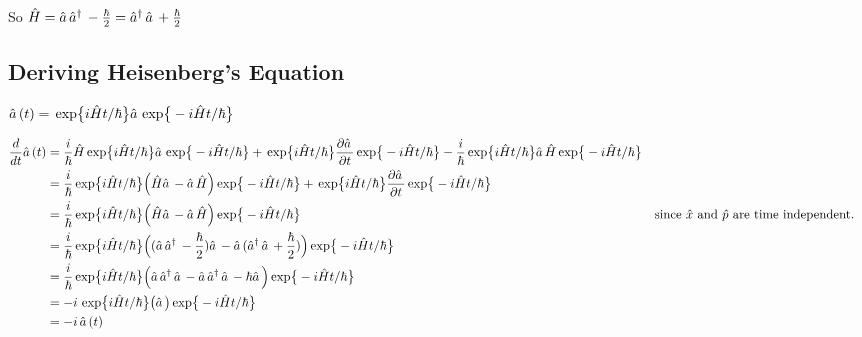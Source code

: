 \documentclass{article}
\renewcommand{\exp}[1]{\,\text{exp} \big\{ #1 \big\} }
\begin{document}
So
\( \hat{H}
    = \hat{a} \,\hat{a}^{\dagger} \, - \frac{\hbar}{2}
    = \hat{a}^{\dagger} \,\hat{a} \, + \frac{\hbar}{2}
\)

\subsection*{Deriving  Heisenberg's Equation}
\( \aop(t) = \exp{i\hat{H}t/\hbar} \aop \exp{-i\hat{H}t/\hbar} \)

\begin{align*}
    \frac{d}{dt} \aop(t)
    &= \frac{i}{\hbar}\hat{H} \exp{i\hat{H}t/\hbar} \aop \exp{-i\hat{H}t/\hbar} +
        \exp{i\hat{H}t/\hbar} \frac{\partial \aop}{\partial t} \exp{-i\hat{H}t/\hbar} - \frac{i}{\hbar} \exp{i\hat{H}t/\hbar} \aop \hat{H} \exp{-i\hat{H}t/\hbar} \\
    &= \frac{i}{\hbar} \exp{i\hat{H}t/\hbar} \Big( \hat{H}\aop - \aop\hat{H} \Big) \exp{-i\hat{H}t/\hbar} +
        \exp{i\hat{H}t/\hbar} \frac{\partial \aop}{\partial t} \exp{-i\hat{H}t/\hbar} \\
    &= \frac{i}{\hbar} \exp{i\hat{H}t/\hbar} \Big( \hat{H}\aop - \aop\hat{H} \Big) \exp{-i\hat{H}t/\hbar}
        && \text{since $\hat{x}$ and $\hat{p}$ are time independent.}\\
    &= \frac{i}{\hbar} \exp{i\hat{H}t/\hbar} \Big((\aop\adagger - \frac{\hbar}{2}) \aop - \aop(\adagger\aop + \frac{\hbar}{2}) \Big) \exp{-i\hat{H}t/\hbar} \\
    &= \frac{i}{\hbar} \exp{i\hat{H}t/\hbar} \Big(\aop\adagger\aop - \aop\adagger\aop - \hbar\aop \Big) \exp{-i\hat{H}t/\hbar} \\
    &= -i \, \exp{i\hat{H}t/\hbar} \big( \aop \big) \exp{-i\hat{H}t/\hbar} \\
    &= -i \, \aop(t)
\end{align*}


\end{document}
